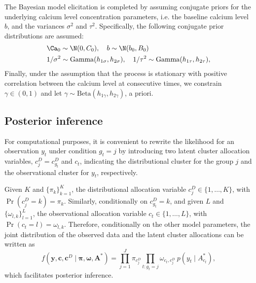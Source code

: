 The Bayesian model elicitation is completed by assuming conjugate priors for the underlying calcium level concentration parameters, i.e. the baseline calcium level $b$, and the variances $\sigma^2$ and $\tau^2$.  Specifically, the following conjugate prior distributions are assumed:
\begin{eqnarray*}
	&\Ca_0 \sim \N(0,C_0), \quad b\sim \N(b_0,B_0) \\ 
	&1/\sigma^2 \sim \mathrm{Gamma}(h_{1\sigma},h_{2\sigma}),\quad 
	1/\tau^2 \sim \mathrm{Gamma}(h_{1\tau},h_{2\tau}),
\end{eqnarray*}
Finally, under the assumption that the process is stationary with positive correlation between the calcium level at consecutive times, we constrain $\gamma \in (0,1)$ and let $\gamma\sim \mathrm{Beta}(h_{1\gamma}, h_{2\gamma})$, a priori.



\subsection{Posterior inference}
\label{s:posterior_inference}

For computational purposes, it is convenient to rewrite the likelihood for an observation $y_t$ under condition $g_t=j$ by introducing two latent cluster allocation variables, $c^D_j = c^D_{g_t}$ and $c_t$, indicating the distributional cluster for the group $j$ and the observational cluster for $y_t$, respectively. 

Given $K$ and $\{\pi_k\}_{k=1}^K$, the distributional allocation variable $c^D_j\in\{1,\dots,K\}$, with $\Pr(c^D_j = k) = \pi_k$. Similarly, conditionally on $c^D_{g_t} =k$, and given $L$ and $\{\omega_{l,k}\}_{l=1}^L$, the observational allocation variable $c_t \in \{1,\dots,L\}$, with $\Pr(c_t = l) = \omega_{l,k}$. 
Therefore, conditionally on the other model parameters, the joint distribution of the observed data and the latent cluster allocations can be written as
\begin{equation*}
f(\bm{y},\bm{c},\bm{c}^D\mid \bm{\pi}, \bm{\omega}, \bm{A}^*) = \prod_{j=1}^J \pi_{c^D_j} \prod_{t:g_t = j} \omega_{c_t,c^D_j}\: p(y_t\mid A^*_{c_t}),
\end{equation*}
which facilitates posterior inference. 


